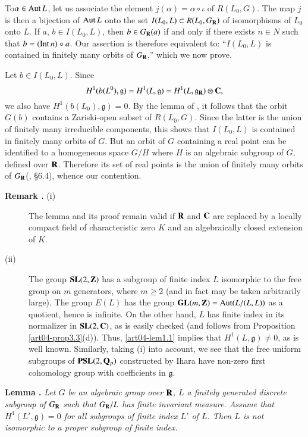 To\pageoriginale $\alpha\in \operatorname{\mathrm{Aut}} L$, let us associate the element $j(\alpha)=\alpha\circ \iota$ of $R(L_{0},G)$. The map $j$ is then a bijection of $\operatorname{\mathrm{Aut}} L$ onto the set $I(L_{0},L)\subset R(L_{0},G_{\mathbf{R}})$ of isomorphisms of $L_{0}$ onto $L$. If $a$, $b\in I(L_{0},L)$, then $b\in G_{\mathbf{R}}(a)$ if and only if there exists $n\in N$ such that $b=(\operatorname{\mathrm{Int}} n)\circ a$. Our assertion is therefore equivalent to: ``$I(L_{0},L)$ is contained in finitely many orbits of $G_{\mathbf{R}}$,'' which we now prove.

Let $b\in I(L_{0},L)$. Since
$$
H^{1}(b(L^{0}),\mathfrak{g})=H^{1}(L,\mathfrak{g})=H^{1}(L,\mathfrak{g}_{\mathbf{R}})\otimes \mathbf{C},
$$
we also have $H^{1}(b(L_{0}),\mathfrak{g})=0$. By the lemma of \cite{art04-key33}, it follows that the orbit $G(b)$ contains a Zariski-open subset of $R(L_{0},G)$. Since the latter is the union of finitely many irreducible components, this shows that $I(L_{0},L)$ is contained in finitely many orbits of $G$. But an orbit of $G$ containing a real point can be identified to a homogeneous space $G/H$ where $H$ is an algebraic subgroup of $G$, defined over $\mathbf{R}$. Therefore its set of real points is the union of finitely many orbits of $G_{\mathbf{R}}$(\cite{art04-key8}, \S6.4), whence our contention.

\medskip
\begin{description}
\item[{\bf Remark .\label{art04-rem1.2}} {\rm(i)}]
The lemma and its proof remain valid if $\mathbf{R}$ and $\mathbf{C}$ are replaced by a locally compact field of characteristic zero $K$ and an algebraically closed extension of $K$.

\item[\rm(ii)] The group $\mathbf{SL}(2,\mathbf{Z})$ has a subgroup of finite index $L$ isomorphic to the free group on $m$ generators, where $m\geq 2$ (and in fact may be taken arbitrarily large). The group $E(L)$ has the group $\mathbf{GL}(m,\mathbf{Z})=\operatorname{\mathrm{Aut}} (L/(L,L))$ as a quotient, hence is infinite. On the other hand, $L$ has finite index in its normalizer in $\mathbf{SL}(2,\mathbf{C})$, as is easily checked (and follows from Proposition \ref{art04-prop3.3}(d)). Thus, \ref{art04-lem1.1} implies that $H^{1}(L,\mathfrak{g})\neq 0$, as is well known. Similarly, taking (i) into account, we see that the free uniform subgroups of $\mathbf{PSL}(2,\mathbf{Q}_{p})$ constructed by Ihara \cite{art04-key15} have non-zero first cohomology group with coefficients in $\mathfrak{g}$.
\end{description}

\noindent
{\bf Lemma .\label{art04-lem1.3}}
{\em Let $G$ be an algebraic group over $\mathbf{R}$, $L$ a finitely generated discrete subgroup of $G_{\mathbf{R}}$ such that $G_{\mathbf{R}}/L$ has finite invariant measure. Assume that $H^{1}(L',\mathfrak{g})=0$ for all subgroups of finite index $L'$ of $L$. Then $L$ is not isomorphic to a proper subgroup of finite index.}
\smallskip

